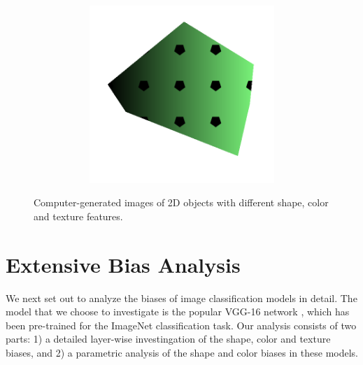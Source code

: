 \begin{figure}[h!]
\begin{center}
\begin{subfigure}[b]{0.15\textwidth}
\begin{center}
\begin{subfigure}[b]{0.9\textwidth}
                \end{subfigure}
                \begin{subfigure}[b]{0.9\textwidth}
                    \includegraphics[width=\linewidth]{figures/generated_objects/img0005.png}
                \end{subfigure}
            \end{center}
        \end{subfigure}
    \end{center}
    \caption{Computer-generated images of 2D objects with different shape, color and texture features.}
    \label{fig:generated_images}
\end{figure}

\section{Extensive Bias Analysis}
We next set out to analyze the biases of image classification models in detail. The model that
we choose to investigate is the popular VGG-16 network \cite{}, which has been pre-trained for
the ImageNet classification task.
Our analysis consists of two parts: 1) a detailed layer-wise investingation of the shape, color and
texture biases, and 2) a parametric analysis of the shape and color biases in these models.

